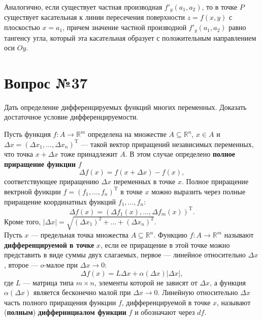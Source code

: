 \documentclass[12pt]{report}
\numberwithin{equation}{section}
\begin{document}
Аналогично, если существует частная производная $f'_y(a_1, a_2)$, то в точке $P$ существует касательная к линии пересечения поверхности $z = f(x,y)$ с плоскостью $x = a_1$, причем значение частной производной $f'_y(a_1, a_2)$ равно тангенсу угла, который эта касательная образует с положительным направлением оси $Oy$.

\newpage \section{Вопрос №37} %
\begin{framed}
Дать определение дифференцируемых функций многих переменных. Доказать достаточное
условие дифференцируемости.
\end{framed}
Пусть функция $f : A \to \mathbb{R}^m$ определена  на множестве $A \subseteq \mathbb{R}^n$, $x \in A$ и $\Delta x = (\Delta x_1, \ldots, \Delta x_n)^{\mathrm{T}}$ --- такой вектор приращений независимых переменных, что точка $x + \Delta x$ тоже принадлежит $A$. В этом случае определено \textbf{полное приращение функции} $f$
\[ \Delta f(x) = f(x + \Delta x) - f(x),\]
соответствующее приращению $\Delta x$ переменных в точке $x$. Полное приращение вектрной функции $f = (f_1, \ldots, f_n)^{\mathrm{T}}$ в точке $x$ можно выразить через полные приращение координатных функций $f_1, \ldots, f_n$:
\begin{equation} \label{eq:37:1} \Delta f(x) = (\Delta f_1(x), \ldots, \Delta f_m(x))^{\mathrm{T}}. \end{equation}
Кроме того, $|\Delta x| = \sqrt{(\Delta x_1)^2 + \dots + (\Delta x_n)^2}$.\\


Пусть $x$ --- предельная точка множества $A \subseteq \mathbb{R}^n$. Функцию $f: A \to \mathbb{R}^m$ называют \textbf{дифференцируемой в точке} $x$, если ее приращение в этой точке можно представить в виде суммы двух слагаемых, первое --- линейное относительно $\Delta x$, второе --- $o$-малое при $\Delta x \to 0$:
\begin{equation} \label{eq:37:2}
\Delta f(x) = L \Delta x + \alpha(\Delta x)|\Delta x|,
\end{equation}
где $L$ --- матрица типа $m \times n$, элементы которой не зависят от $\Delta x$, а функция $\alpha(\Delta x)$ является бесконечно малой при $\Delta x \to 0$. Линейную относительно $\Delta x$ часть полного приращения функции $f$, дифференцируемой в точке $x$, называют (\textbf{полным}) \textbf{диффернициалом функции} $f$ и обозначают через $df$.\\
\end{document}
